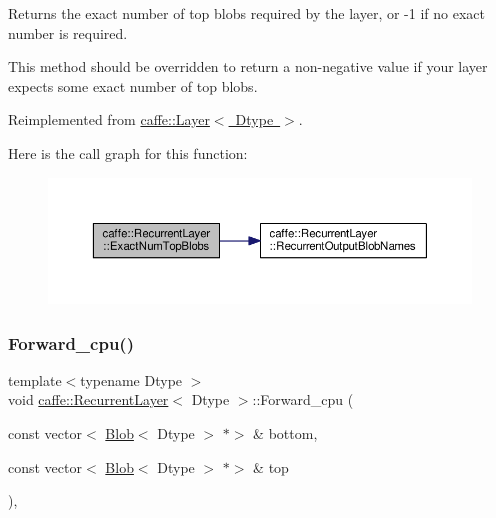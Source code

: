 Returns the exact number of top blobs required by the layer, or -\/1 if no exact number is required. 

This method should be overridden to return a non-\/negative value if your layer expects some exact number of top blobs. 

Reimplemented from \mbox{\hyperlink{classcaffe_1_1_layer_a64e2ca72c719e4b2f1f9216ccfb0d37f}{caffe\+::\+Layer$<$ Dtype $>$}}.

Here is the call graph for this function\+:
\nopagebreak
\begin{figure}[H]
\begin{center}
\leavevmode
\includegraphics[width=350pt]{classcaffe_1_1_recurrent_layer_a4cb9032f0942c0fef5f6c7094c7b2ab8_cgraph}
\end{center}
\end{figure}
\mbox{\label{classcaffe_1_1_recurrent_layer_a9f0e34d7534fac027c640e66f55a18d2}} 
\subsubsection{\texorpdfstring{Forward\+\_\+cpu()}{Forward\_cpu()}\hspace{0.1cm}{\footnotesize\ttfamily [1/2]}}
{\footnotesize\ttfamily template$<$typename Dtype $>$ \\
void \mbox{\hyperlink{classcaffe_1_1_recurrent_layer}{caffe\+::\+Recurrent\+Layer}}$<$ Dtype $>$\+::Forward\+\_\+cpu (\begin{DoxyParamCaption}\item[{const vector$<$ \mbox{\hyperlink{classcaffe_1_1_blob}{Blob}}$<$ Dtype $>$ $\ast$$>$ \&}]{bottom,  }\item[{const vector$<$ \mbox{\hyperlink{classcaffe_1_1_blob}{Blob}}$<$ Dtype $>$ $\ast$$>$ \&}]{top }\end{DoxyParamCaption})\hspace{0.3cm}{\ttfamily [protected]}, {\ttfamily [virtual]}}


